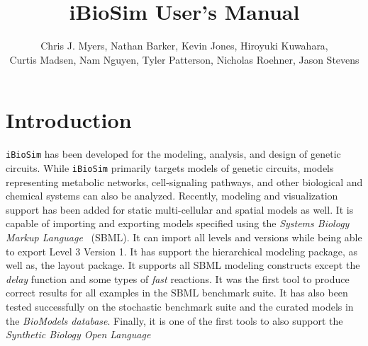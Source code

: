 \documentclass[titlepage,11pt]{article}
\title{iBioSim User's Manual}
\author{Chris J. Myers, Nathan Barker, Kevin Jones, Hiroyuki Kuwahara,\\ Curtis
  Madsen, Nam Nguyen, Tyler Patterson, Nicholas Roehner, Jason Stevens}
\begin{document}
\maketitle

  
\tableofcontents

\clearpage
  

\section{Introduction}

\noindent
{\tt iBioSim} has been developed for the modeling, analysis, and design of genetic circuits.  While {\tt iBioSim} primarily targets models of genetic circuits, models representing metabolic networks, cell-signaling pathways, and other biological and chemical systems can also be analyzed.  Recently, modeling and visualization support has been added for static multi-cellular and spatial models as well.
It is capable of importing and exporting models specified using the %
\emph{Systems Biology Markup Language}
~(SBML).  It can import all levels and versions while being able to export Level 3 Version 1.  It has support the hierarchical modeling package, as well as, the layout package.  It supports all SBML modeling constructs except the \emph{delay} function and some types of \emph{fast} reactions.  It was the first tool to produce correct results for all examples in the SBML benchmark suite.  It has also been tested successfully on the stochastic benchmark suite and the curated models in the 
\emph{BioModels database}.
Finally, it is one of the first tools to also support the 
\emph{Synthetic Biology Open Language}
\end{document}
